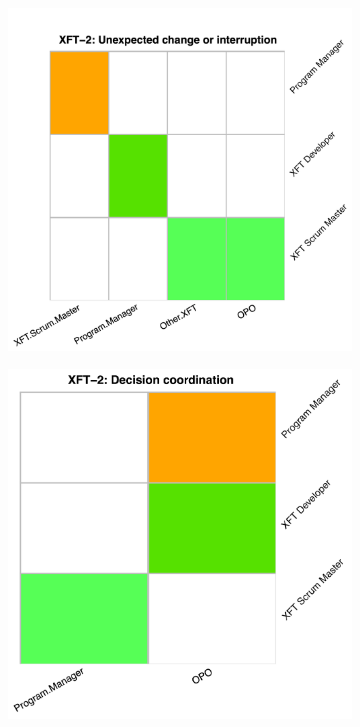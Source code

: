 \begin{figure}
\begin{subfigure}{.5\textwidth}
    \includegraphics[width=.91\linewidth]{figures/heatmaps/picnic-_u_.pdf}
    \label{fig:hm-u-picnic}
  \end{subfigure}%
  \begin{subfigure}{.5\textwidth}
    \centering
    \includegraphics[width=.81\linewidth]{figures/heatmaps/picnic-_d_.pdf}
    \label{fig:hm-d-picnic}
  \end{subfigure}
  \begin{subfigure}{.5\textwidth}

\end{subfigure}
\end{figure}
